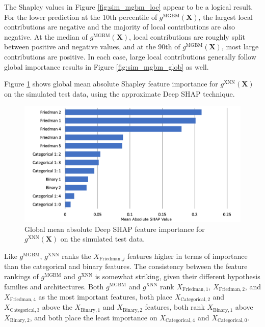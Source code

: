 \documentclass[information,article,accept,moreauthors,pdftex]{Definitions/mdpi}
\begin{document}
{The Shapley values in Figure \ref{fig:sim_mgbm_loc} appear to be a logical result. For the lower prediction at the 10{th} percentile of $g^\text{MGBM}(\mathbf{X})$, the largest local contributions are negative and the majority of local contributions are also negative. At the median of $g^\text{MGBM}(\mathbf{X})$, local contributions are roughly split between positive and negative values, and at the 90{th} of $g^\text{MGBM}(\mathbf{X})$, most large contributions are positive. In each case, large local contributions generally follow global importance results in Figure \ref{fig:sim_mgbm_glob} as well.

Figure \ref{fig:sim_xnn_glob} shows global mean absolute Shapley feature importance for $g^\text{XNN}(\mathbf{X})$ on the simulated test data, using the approximate Deep SHAP technique.  

\begin{figure}[H]
\centering
	\captionsetup{width=16cm}
	\centering
	\includegraphics[width=12cm]{img/sim_xnn_glob.png}
	\caption{Global mean absolute Deep SHAP feature importance for $g^\text{XNN}(\mathbf{X})$ on the simulated test data.}
	\label{fig:sim_xnn_glob}
\end{figure} 

Like $g^\text{MGBM}$, $g^\text{XNN}$ ranks the $X_{\text{Friedman},j}$ features higher in terms of importance than the categorical and binary features. The consistency between the feature rankings of $g^\text{MGBM}$ and $g^\text{XNN}$ is somewhat striking, given their different hypothesis families and architectures. Both $g^\text{MGBM}$ and $g^\text{XNN}$ rank $X_{\text{Friedman},1}$, $X_{\text{Friedman},2}$, and $X_{\text{Friedman},4}$ as the most important features, both place $X_{\text{Categorical},2}$ and $X_{\text{Categorical},3}$ above the $X_{\text{Binary},1}$ and $X_{\text{Binary},2}$ features, both rank $X_{\text{Binary},1}$ above $X_{\text{Binary},2}$, and both place the least importance on $X_{\text{Categorical},4}$ and $X_{\text{Categorical},0}$. 

}
\end{document}
